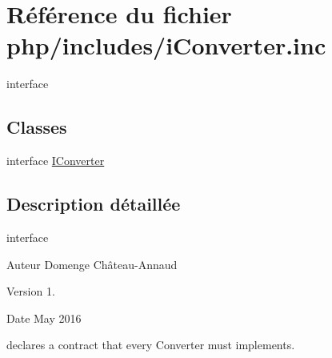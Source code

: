 \hypertarget{i_converter_8inc}{}\section{Référence du fichier php/includes/i\+Converter.inc}
\label{i_converter_8inc}


interface  


\subsection*{Classes}
\begin{DoxyCompactItemize}
\item 
interface \hyperlink{interface_i_converter}{I\+Converter}
\end{DoxyCompactItemize}


\subsection{Description détaillée}
interface 

\begin{DoxyAuthor}{Auteur}
Domenge Château-\/\+Annaud 
\end{DoxyAuthor}
\begin{DoxyVersion}{Version}
1. 
\end{DoxyVersion}
\begin{DoxyDate}{Date}
May 2016
\end{DoxyDate}
declares a contract that every Converter must implements. 
